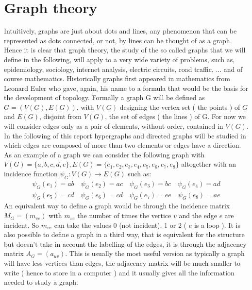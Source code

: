 \newtheorem{theorem}{Theorem}[section]
\newtheorem{corollary}{Corollary}[theorem]
\newtheorem{lemma}[theorem]{Lemma}

\section{Graph theory}
Intuitively, graphs are just about dots and lines, any phenomenon that can be represented as dots connected, or not, by lines can be thought of as a graph. 
Hence it is clear that graph theory, the study of the so called graphs that we will define in the following, will apply to a very wide variety of problems, such as, epidemiology, sociology, internet analysis, electric circuits, road traffic, ... and of course mathematics. 
Historically graphs first appeared in mathematics from Leonard Euler who gave, again, his name to a formula that would be the basis for the development of topology.
\newline
Formally a graph G will be defined as $G = ( V(G), E(G) )$, with $V(G)$ designing the vertex set ( the points ) of $G$ and $E(G)$, disjoint from $V(G)$, the set of edges ( the lines ) of G. 
For now we will consider edges only as a pair of elements, without order, contained in $V(G)$. In the following of this report hypergraphs and directed graphs will be studied in which edges are composed of more than two elements or edges have a direction.
\newline
As an example of a graph we can consider the following graph with $ V(G) = \{a, b, c, d, e\}, E(G) = \{e_1,e_2, e_3, e_4, e_5, e_6, e_7, e_8\}$ altogether with an incidence function $\psi_G : V(G) \rightarrow E(G) $ such as:
\begin{align*}
    \psi_G(e_1) = ab\quad
    \psi_G(e_2) = ac\quad
    \psi_G(e_3) = bc\quad
    \psi_G(e_4) = ad\\
    \psi_G(e_5) = cd\quad
    \psi_G(e_6) = cd\quad
    \psi_G(e_7) = ee\quad
    \psi_G(e_8) = ae
\end{align*}
An equivalent way to define a graph would be through the incidence matrix $M_G = (m_{ve}) $ with $m_{ve}$ the number of times the vertice $v$ and the edge $e$ are incident. So $m_{ve}$ can take the values 0 (not incident), 1 or 2 ( $e$ is a loop ).
It is also possible to define a graph in a third way, that is equivalent for the structure but doesn't take in account the labelling of the edges, it is through the adjacency matrix $A_G = (a_{uv})$.
This is usually the most useful version as typically a graph will have less vertices than edges, the adjacency matrix will be much smaller to write ( hence to store in a computer ) and it usually gives all the information needed to study a graph. 
